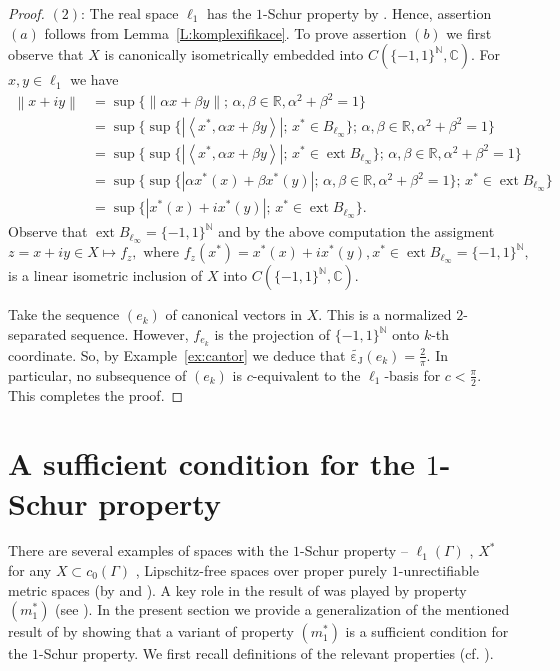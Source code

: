 \documentclass{amsart}
\numberwithin{equation}{section}
\theoremstyle{definition}
\def\ce{\mathbb C}
\def\en{\mathbb N}
\def\er{\mathbb R}
\def \ext {\operatorname{ext}}
\def\ip#1#2{\left\langle#1,#2\right\rangle}
\def\dcj#1{\widetilde{\operatorname{\varepsilon_J}}\left(#1\right)}
\newcommand{\norm}[1]{\left\|#1\right\|}
\newcommand{\abs}[1]{\left|#1\right|}
\newcommand{\setsep}{;\,}
\begin{document}
\begin{proof}
     
    $(2)$: The real space $\ell_1$ has the $1$-Schur property by \cite[Theorem 1.3]{qschur}. Hence,  assertion $(a)$ follows from Lemma~\ref{L:komplexifikace}. To prove assertion $(b)$ we first observe that $X$ is canonically isometrically embedded into $C(\{-1,1\}^\en,\ce)$. For $x,y\in \ell_1$ we have
    $$\begin{aligned}
        \norm{x+iy}&=\sup\{\norm{\alpha x+\beta y}\setsep\alpha,\beta\in\er,\alpha^2+\beta^2=1\}
        \\&= \sup\{\sup\{\abs{\ip{x^*}{\alpha x+\beta y}}\setsep x^*\in B_{\ell_\infty}\}\setsep\alpha,\beta\in\er,\alpha^2+\beta^2=1\}
        \\&= \sup\{\sup\{\abs{\ip{x^*}{\alpha x+\beta y}}\setsep x^*\in\ext B_{\ell_\infty}\}\setsep\alpha,\beta\in\er,\alpha^2+\beta^2=1\}
         \\&= \sup\{\sup\{\abs{\alpha x^*(x)+\beta x^*(y)}\setsep\alpha,\beta\in\er,\alpha^2+\beta^2=1 \}\setsep x^*\in\ext B_{\ell_\infty}\}
         \\&=\sup\{\abs{x^*(x)+ix^*(y)}\setsep x^*\in\ext B_{\ell_\infty}\}.
    \end{aligned}$$
   Observe that $\ext B_{\ell_\infty}=\{-1,1\}^\en$ and by the above computation the assigment
   $$ z=x+iy\in X\mapsto f_z, \mbox{ where }f_z(x^*)=x^*(x)+ix^*(y), x^*\in \ext B_{\ell_\infty}=\{-1,1\}^\en,$$
   is a linear isometric inclusion of $X$ into $C(\{-1,1\}^\en,\ce)$. 

    Take the sequence $(e_k)$ of canonical vectors in $X$. This is a normalized $2$-separated sequence. However,
    $f_{e_k}$ is the projection of $\{-1,1\}^\en$ onto $k$-th coordinate. So, by Example~\ref{ex:cantor} we deduce that $\dcj{e_k}=\frac2\pi$. In particular, no subsequence of $(e_k)$ is $c$-equivalent to the $\ell_1$-basis for $c<\frac\pi2$. This completes the proof.
  \end{proof}


\section{A sufficient condition for the $1$-Schur property}\label{sec:m1}

There are several examples of spaces with the $1$-Schur property -- $\ell_1(\Gamma)$ \cite[Theorem 1.3]{qschur},
$X^*$ for any $X\subset c_0(\Gamma)$ \cite[Theorem 1.1]{qschur-dp}, Lipschitz-free spaces over proper purely $1$-unrectifiable metric spaces  (by \cite[Proposition 17]{petitjean-schur} and \cite[Theorem 3.2]{p1u}). A key role in 
the result of \cite{qschur-dp} was played by property $(m_1^*)$ (see \cite[Lemma 1.2]{qschur-dp}). In the present section we provide a generalization of the mentioned result of \cite{qschur-dp} by showing that a variant of property $(m_1^*)$ is a sufficient condition for the $1$-Schur property. We first recall definitions of the relevant properties (cf. \cite[Definition 2.1]{kalton-werner}). 
\end{document}
